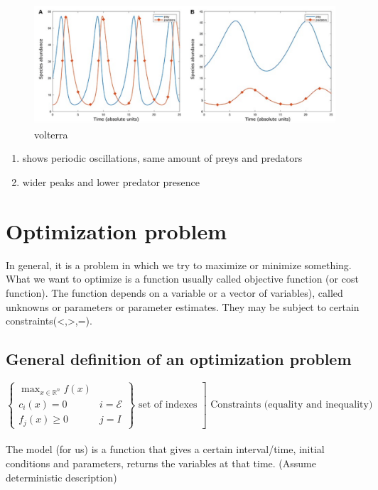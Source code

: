 \begin{figure}
\centering
\includegraphics[width=\textwidth]{volterra.png}
\caption{volterra}
\end{figure}

\begin{enumerate}
\def\labelenumi{\Alph{enumi})}
\item
  shows periodic oscillations, same amount of preys and predators
\item
  wider peaks and lower predator presence
\end{enumerate}

\section{Optimization problem}

In general, it is a problem in which we try to maximize or minimize
something. What we want to optimize is a function usually called
objective function (or cost function). The function depends on a
variable or a vector of variables), called unknowns or parameters or
parameter estimates. They may be subject to certain
constraints(\textless,\textgreater,=).

\subsection{General definition of an optimization problem}

$\left.\left\{\begin{array}{ll} \max _{x \in \mathbb{R}^n} f(x) & \\ c_i(x)=0 & i=\mathcal{E}\\ f_j(x) \geq 0 & j = I \end{array}\right\} \text { set of indexes }\right] \text { Constraints (equality and inequality) }$
\\
\\
\noindent
The model (for us) is a function that gives a certain interval/time,
initial conditions and parameters, returns the variables at that time.
(Assume deterministic description)

